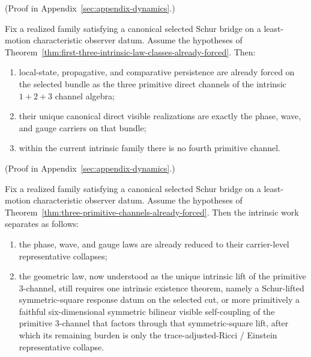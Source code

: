 (Proof in Appendix~\ref{sec:appendix-dynamics}.)

\begin{theorem}
\label{thm:three-primitive-channels-already-forced}
Fix a realized family satisfying a canonical selected Schur bridge on a
least-motion characteristic observer datum. Assume the hypotheses of
Theorem~\ref{thm:first-three-intrinsic-law-classes-already-forced}. Then:
\begin{enumerate}[label=(\roman*), leftmargin=2em, itemsep=0.2em]
\item local-state, propagative, and comparative persistence are already forced
      on the selected bundle as the three primitive direct channels of the
      intrinsic \(1+2+3\) channel algebra;
\item their unique canonical direct visible realizations are exactly the
      phase, wave, and gauge carriers on that bundle;
\item within the current intrinsic family there is no fourth primitive
      channel.
\end{enumerate}
\end{theorem}

(Proof in Appendix~\ref{sec:appendix-dynamics}.)

\begin{corollary}
\label{cor:geometry-only-remaining-intrinsic-existence-lane}
Fix a realized family satisfying a canonical selected Schur bridge on a
least-motion characteristic observer datum. Assume the hypotheses of
Theorem~\ref{thm:three-primitive-channels-already-forced}. Then the
intrinsic work separates as follows:
\begin{enumerate}[label=(\roman*), leftmargin=2em, itemsep=0.2em]
\item the phase, wave, and gauge laws are already reduced to their
      carrier-level representative collapses;
\item the geometric law, now understood as the unique intrinsic lift of the
      primitive \(3\)-channel, still requires one intrinsic existence theorem,
      namely a Schur-lifted symmetric-square response datum on the selected
      cut, or more primitively a faithful six-dimensional symmetric bilinear
      visible self-coupling of the primitive \(3\)-channel that factors
      through that symmetric-square lift, after which its remaining burden is
      only the
      trace-adjusted-Ricci / Einstein representative collapse.
\end{enumerate}
\end{corollary}

